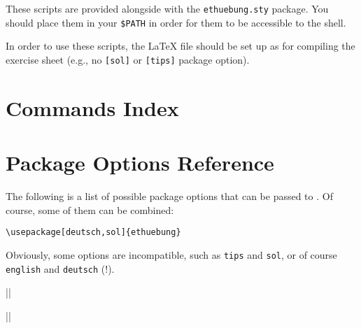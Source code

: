 \documentclass[11pt,a4paper]{article}
\begin{document}
These scripts are provided alongside with the \texttt{ethuebung.sty} package. You should
place them in your \texttt{\$PATH} in order for them to be accessible to the shell.

\begin{pkgnotice}
  In order to use these scripts, the \LaTeX{} file should be set up as for compiling the
  exercise sheet (e.g., no \texttt{[sol]} or \texttt{[tips]} package option).
\end{pkgnotice}


\section{Commands Index}
\label{sec:AllCommands}

\pkgshowcmdindex


\section{Package Options Reference}
\label{sec:PackageOptions}

The following is a list of possible package options that can be passed to \ethuebung. Of
course, some of them can be combined:
\begin{pkgverbatim}
\begin{verbatim}
\usepackage[deutsch,sol]{ethuebung}
\end{verbatim}
\end{pkgverbatim}

Obviously, some options are incompatible, such as \texttt{tips} and \texttt{sol}, or
of course \texttt{english} and \texttt{deutsch} (!).



\verbdef\ueblangdeutsch||

\verbdef\ueblangenglish||
\end{document}
